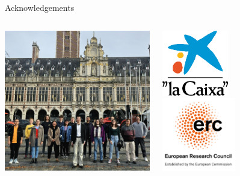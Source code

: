 \documentclass[9pt,t,xcolor=table]{beamer}
\begin{document}
\begin{frame}{\huge Acknowledgements}\large
	\centering
	\begin{columns}
		\begin{column}[c]{0.48\textwidth}
			\centering
			\vfill
			\includegraphics[width=\textwidth]{Figs/TJ.jpeg}
			\vfill
		\end{column}
		\begin{column}[c]{0.3\textwidth}
			\centering
			\includegraphics[width=0.45\textwidth]{Figs/La-Caixa.png}\\\vfill
			\includegraphics[width=0.5\textwidth]{Figs/erc.png}\\\vfill

\end{column}
\end{columns}
\end{frame}
\end{document}
